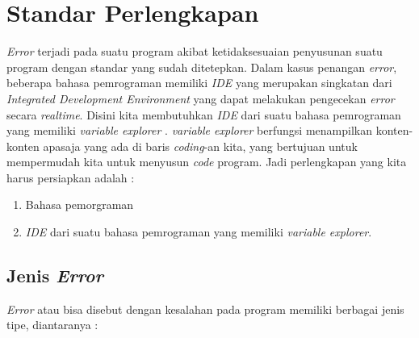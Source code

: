 \chapter{Standar Perlengkapan}
\textit{Error} terjadi pada suatu program akibat ketidaksesuaian penyusunan suatu program dengan standar yang sudah ditetepkan.
Dalam kasus penangan \textit{error}, beberapa bahasa pemrograman memiliki \textit{IDE} yang merupakan singkatan dari \textit{Integrated Development Environment} yang dapat melakukan pengecekan \textit{error} secara \textit{realtime}. Disini kita membutuhkan \textit{IDE} dari suatu bahasa pemrograman yang memiliki \textit{variable explorer} . \textit{variable explorer} berfungsi menampilkan konten-konten apasaja yang ada di baris \textit{coding}-an kita, yang bertujuan untuk mempermudah kita untuk menyusun \textit{code} program. Jadi perlengkapan yang kita harus persiapkan adalah :

\begin{enumerate}
\item Bahasa pemorgraman
\item \textit{IDE} dari suatu bahasa pemrograman yang memiliki \textit{variable explorer}.
\end{enumerate}

\section{Jenis \textit{Error}}
\par 
\textit{Error} atau bisa disebut dengan kesalahan pada program memiliki berbagai jenis tipe, diantaranya :

